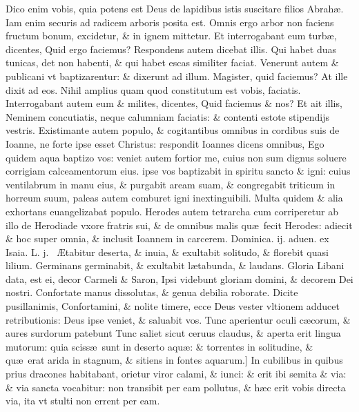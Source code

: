 \documentclass[a5paper,10pt]{book}
\def\leftmarginnote{%
	\lrmarginnote{\hskip -\marginparsep \hskip -6.5em}}
\def\rightmarginnote{%
	\lrmarginnote{\hskip\columnwidth \hskip -1em}}
\def\ae{æ}
\def\AE{Æ}
\begin{document}
\begin{multicols*}{2}
Dico enim vobis, quia potens est Deus de lapidibus istis suscitare filios Abrah\ae .
Iam enim securis ad radicem arboris posita est.
Omnis ergo arbor non faciens fructum bonum, excidetur, \& in ignem mittetur.
Et interrogabant eum turb\ae , dicentes, Quid ergo faciemus?
Respondens autem dicebat illis. Qui habet duas tunicas, det non habenti, \& qui habet escas similiter faciat.
Venerunt autem \& publicani vt baptizarentur: \& dixerunt ad illum. Magister, quid faciemus? At ille dixit ad eos. Nihil amplius quam quod constitutum est vobis, faciatis.
Interrogabant autem eum \& milites, dicentes, Quid faciemus \& nos? Et ait illis, Neminem concutiatis, neque calumniam faciatis: \& contenti estote stipendijs vestris.
Existimante autem populo, \& cogitantibus omnibus in cordibus suis de Ioanne, ne forte ipse esset Christus: respondit Ioannes dicens omnibus, Ego quidem aqua baptizo vos: veniet autem fortior me,
cuius non sum dignus soluere corrigiam calceamentorum eius. ipse vos baptizabit in spiritu sancto \& igni: cuius ventilabrum in manu eius, \& purgabit aream suam, \& congregabit triticum in horreum suum, paleas autem comburet igni inextinguibili.
Multa quidem \& alia exhortans euangelizabat populo.
Herodes autem tetrarcha cum corriperetur ab illo de Herodiade vxore fratris sui, \& de omnibus malis qu\ae \ fecit Herodes: adiecit \& hoc super omnia, \& inclusit Ioannem in carcerem.
\newline {} \color{red} \hypertarget{SUN-SECUNDA-ADV}{Dominica. ij. aduen.} ex Isaia. \hfill L. j. \color{black}
\vspace{-2.25em}
\textdagger \ \AE tabitur\leftmarginnote{\begin{flushright}c. 35.\\a\end{flushright}} deserta, \& inuia, \& exultabit solitudo, \& florebit quasi lilium.
Germinans germinabit, \& exultabit l\ae tabunda, \& laudans.
Gloria Libani data, est ei, decor Carmeli \& Saron, Ipsi videbunt gloriam domini, \& decorem Dei nostri.
Confortate manus dissolutas, \& genua debilia roborate.
Dicite pusillanimis, Confortamini, \& nolite timere, ecce Deus vester vltionem adducet retributionis: Deus ipse veniet, \& saluabit vos.
Tunc aperientur oculi c\ae corum, \& aures surdorum patebunt
Tunc saliet sicut ceruus claudus, \& aperta erit lingua mutorum: quia sciss\ae \ sunt in deserto aqu\ae : \& torrentes in solitudine, \& qu\ae \ erat arida in stagnum, \& sitiens in fontes aquarum.]
In\rightmarginnote{B} cubilibus in quibus prius dracones habitabant, orietur viror calami, \& iunci: \& erit ibi semita \& via: \& via sancta vocabitur: non transibit per eam pollutus, \& h\ae c erit vobis directa via, ita vt stulti non errent per eam.

\end{multicols*}
\end{document}
